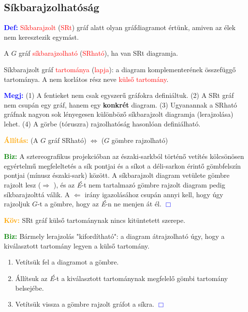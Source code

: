 \documentclass[../szamtud.tex]{subfiles}
\begin{document}
    \subsection{Síkbarajzolhatóság}

        \textcolor{blue}{\textbf{Def:}} \textcolor{red}{Síkbarajzolt} (\textcolor{red}{SRt}) gráf alatt olyan gráfdiagramot értünk, amiven az  élek nem keresztezik egymást.

        A $G$ gráf \textcolor{red}{síkbarajzolható} (\textcolor{red}{SRható}), ha van SRt diagramja. 

        Síkbarajzolt gráf \textcolor{red}{tartománya} (\textcolor{red}{lapja}): a diagram komplementerének összefüggő tartománya. A nem korlátos rész neve \textcolor{red}{külső tartomány}. 

        \textcolor{blue}{\textbf{Megj:}} (1) A fentieket nem csak egyszerű gráfokra definiáltuk. (2) A SRt gráf nem csupán egy gráf, hanem egy \textbf{konkrét} diagram. (3) Ugyanannak a SRható gráfnak nagyon sok lényegesen különböző síkbarajzolt diagramja (lerajzolása) lehet. (4) A görbe (tóruszra) rajzolhatóság hasonlóan definiálható.

        \textcolor{orange}{\textbf{Állítás:}} (A $G$ gráf SRható) $\Longleftrightarrow$ ($G$ gömbre rajzolható) 

        \textcolor{green}{\textbf{Biz:}} A sztereografikus projekcióban az északi-sarkból történő vetítés kölcsönösen egyértelmű megfeleltetés a sík pontjai és a síkot a déli-sarkon érintő gömbfelszín pontjai (mínusz északi-sark) között. A síkbarajzolt diagram vetülete gömbre rajzolt lesz ($\Rightarrow$ \checkmark), és az \textit{É}-t nem tartalmazó gömbre rajzolt diagram pedig síkbarajzolttá válik. A $\Leftarrow$ irány igazolásához csupán annyi kell, hogy úgy rajzoljuk $G$-t a gömbre, hogy az \textit{É}-n ne menjen át él. \textcolor{blue}{$\Box$}

        \textcolor{orange}{\textbf{Köv:}} SRt gráf külső tartománynak nincs kitüntetett szerepe.

        \textcolor{green}{\textbf{Biz:}} Bármely lerajzolás "kifordítható": a diagram átrajzolható úgy, hogy a kiválasztott tartomány legyen a külső tartomány.

        \begin{enumerate}
            \item Vetítsük fel a diagramot a gömbre.
            \item Állítsuk az \textit{É}-t a kiválasztott tartománynak megfelelő gömbi tartomány belsejébe.
            \item Vetítsük vissza a gömbre rajzolt gráfot a síkra. \textcolor{blue}{$\Box$}
        \end{enumerate}
\end{document}
